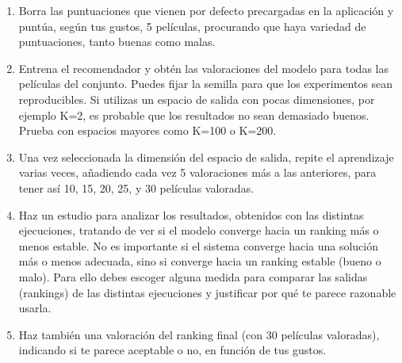 \documentclass{uimppracticas}
\begin{document}
\begin{enumerate}
	\item Borra las puntuaciones que vienen por defecto precargadas en la aplicación y puntúa, según tus gustos, 5 películas, procurando que haya variedad de puntuaciones, tanto buenas como malas.
	
	\item 
	Entrena el recomendador y obtén las valoraciones del modelo para todas las películas del conjunto. Puedes fijar la semilla para que los experimentos sean reproducibles. Si utilizas un espacio de salida con pocas dimensiones, por ejemplo K=2, es probable que los resultados no sean demasiado buenos. Prueba con espacios mayores como K=100 o K=200.
	
	\item Una vez seleccionada la dimensión del espacio de salida, repite el aprendizaje varias veces, añadiendo  cada vez 5 valoraciones más a las anteriores, para tener así 10, 15, 20, 25, y 30 películas valoradas. 
	
	\item Haz un estudio para analizar los resultados, obtenidos con las distintas ejecuciones, tratando de ver si el modelo converge hacia un ranking más o menos estable. No es importante si el sistema converge hacia una solución más o menos adecuada, sino si converge hacia un ranking estable (bueno o malo). Para ello debes escoger alguna medida para comparar las salidas (rankings) de las distintas ejecuciones y justificar por qué te parece razonable usarla.
	
	\item Haz también una valoración del ranking final (con 30 películas valoradas), indicando si te parece aceptable o no, en función de tus gustos.
\end{enumerate}

%
%
\end{document}
